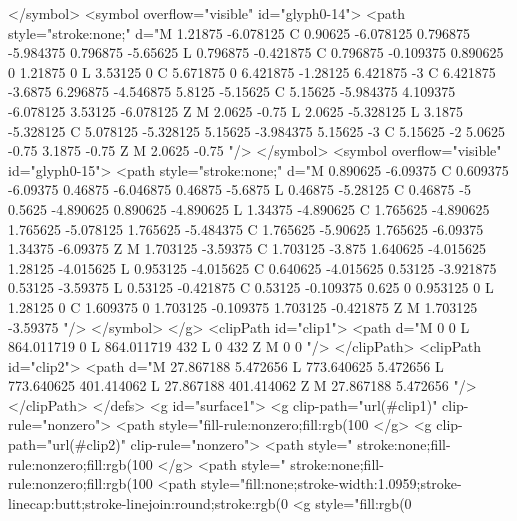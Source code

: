</symbol>
<symbol overflow="visible" id="glyph0-14">
<path style="stroke:none;" d="M 1.21875 -6.078125 C 0.90625 -6.078125 0.796875 -5.984375 0.796875 -5.65625 L 0.796875 -0.421875 C 0.796875 -0.109375 0.890625 0 1.21875 0 L 3.53125 0 C 5.671875 0 6.421875 -1.28125 6.421875 -3 C 6.421875 -3.6875 6.296875 -4.546875 5.8125 -5.15625 C 5.15625 -5.984375 4.109375 -6.078125 3.53125 -6.078125 Z M 2.0625 -0.75 L 2.0625 -5.328125 L 3.1875 -5.328125 C 5.078125 -5.328125 5.15625 -3.984375 5.15625 -3 C 5.15625 -2 5.0625 -0.75 3.1875 -0.75 Z M 2.0625 -0.75 "/>
</symbol>
<symbol overflow="visible" id="glyph0-15">
<path style="stroke:none;" d="M 0.890625 -6.09375 C 0.609375 -6.09375 0.46875 -6.046875 0.46875 -5.6875 L 0.46875 -5.28125 C 0.46875 -5 0.5625 -4.890625 0.890625 -4.890625 L 1.34375 -4.890625 C 1.765625 -4.890625 1.765625 -5.078125 1.765625 -5.484375 C 1.765625 -5.90625 1.765625 -6.09375 1.34375 -6.09375 Z M 1.703125 -3.59375 C 1.703125 -3.875 1.640625 -4.015625 1.28125 -4.015625 L 0.953125 -4.015625 C 0.640625 -4.015625 0.53125 -3.921875 0.53125 -3.59375 L 0.53125 -0.421875 C 0.53125 -0.109375 0.625 0 0.953125 0 L 1.28125 0 C 1.609375 0 1.703125 -0.109375 1.703125 -0.421875 Z M 1.703125 -3.59375 "/>
</symbol>
</g>
<clipPath id="clip1">
  <path d="M 0 0 L 864.011719 0 L 864.011719 432 L 0 432 Z M 0 0 "/>
</clipPath>
<clipPath id="clip2">
  <path d="M 27.867188 5.472656 L 773.640625 5.472656 L 773.640625 401.414062 L 27.867188 401.414062 Z M 27.867188 5.472656 "/>
</clipPath>
</defs>
<g id="surface1">
<g clip-path="url(#clip1)" clip-rule="nonzero">
<path style="fill-rule:nonzero;fill:rgb(100%
</g>
<g clip-path="url(#clip2)" clip-rule="nonzero">
<path style=" stroke:none;fill-rule:nonzero;fill:rgb(100%
</g>
<path style=" stroke:none;fill-rule:nonzero;fill:rgb(100%
<path style="fill:none;stroke-width:1.0959;stroke-linecap:butt;stroke-linejoin:round;stroke:rgb(0%
<g style="fill:rgb(0%
